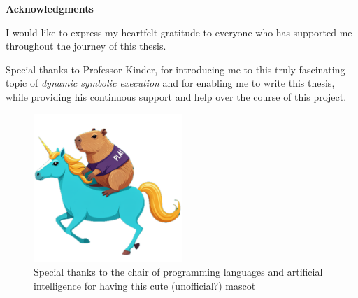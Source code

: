 \thispagestyle{empty}

\vspace*{20mm}

\begin{center}
    \makeatletter

    {\textbf{Acknowledgments}}

    \makeatother
\end{center}

\begin{flushleft}
    I would like to express my heartfelt gratitude to everyone who has supported me throughout the journey of this thesis.
    
    Special thanks to Professor Kinder, for introducing me to this truly fascinating topic of \textit{dynamic symbolic execution} and for enabling me to write this thesis, while providing his continuous support and help over the course of this project.
\capstartfalse

\begin{figure}[h] 
    \centering
    \includegraphics[width=0.5\textwidth]{images/ca-plai-corn.png}
    \caption*{Special thanks to the chair of programming languages and artificial intelligence for having this cute (unofficial?) mascot}
\end{figure}
\capstarttrue

\end{flushleft}

\vspace{10mm}

\cleardoublepage{}
